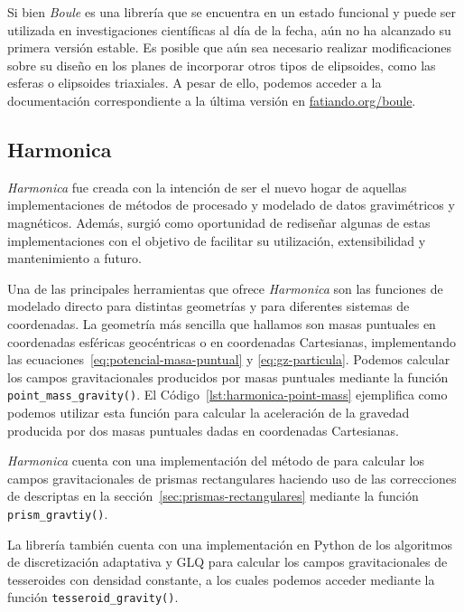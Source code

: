 Si bien \emph{Boule} es una librería que se encuentra en un estado funcional
y puede ser utilizada en investigaciones científicas al día de la fecha, aún no
ha alcanzado su primera versión estable.
Es posible que aún sea necesario realizar modificaciones sobre su diseño en los
planes de incorporar otros tipos de elipsoides, como las esferas o elipsoides
triaxiales.
A pesar de ello, podemos acceder a la documentación correspondiente a la última
versión en \href{https://www.fatiando.org/boule}{fatiando.org/boule}.


\subsection{Harmonica}
\label{sec:harmonica}

\emph{Harmonica} fue creada con la intención de ser el nuevo hogar de aquellas
implementaciones de métodos de procesado y modelado de datos gravimétricos
y magnéticos.
Además, surgió como oportunidad de rediseñar algunas de estas implementaciones
con el objetivo de facilitar su utilización, extensibilidad y mantenimiento
a futuro.

Una de las principales herramientas que ofrece \emph{Harmonica} son las
funciones de modelado directo para distintas geometrías y para diferentes
sistemas de coordenadas.
La geometría más sencilla que hallamos son masas puntuales en coordenadas
esféricas geocéntricas o en coordenadas Cartesianas, implementando las
ecuaciones~\ref{eq:potencial-masa-puntual} y \ref{eq:gz-particula}.
Podemos calcular los campos gravitacionales producidos por masas puntuales
mediante la función \texttt{point\_mass\_gravity()}.
El Código~\ref{lst:harmonica-point-mass} ejemplifica como podemos utilizar esta
función para calcular la aceleración de la gravedad producida por dos masas
puntuales dadas en coordenadas Cartesianas.

\emph{Harmonica} cuenta con una implementación del método de \citet{nagy2000}
para calcular los campos gravitacionales de prismas rectangulares haciendo uso
de las correcciones de \citet{fukushima2020} descriptas en la
sección~\ref{sec:prismas-rectangulares} mediante la función
\texttt{prism\_gravtiy()}.

La librería también cuenta con una implementación en Python de los algoritmos
de discretización adaptativa y \ac{GLQ} para calcular los campos
gravitacionales de tesseroides con densidad constante, a los cuales podemos
acceder mediante la función \texttt{tesseroid\_gravity()}.



